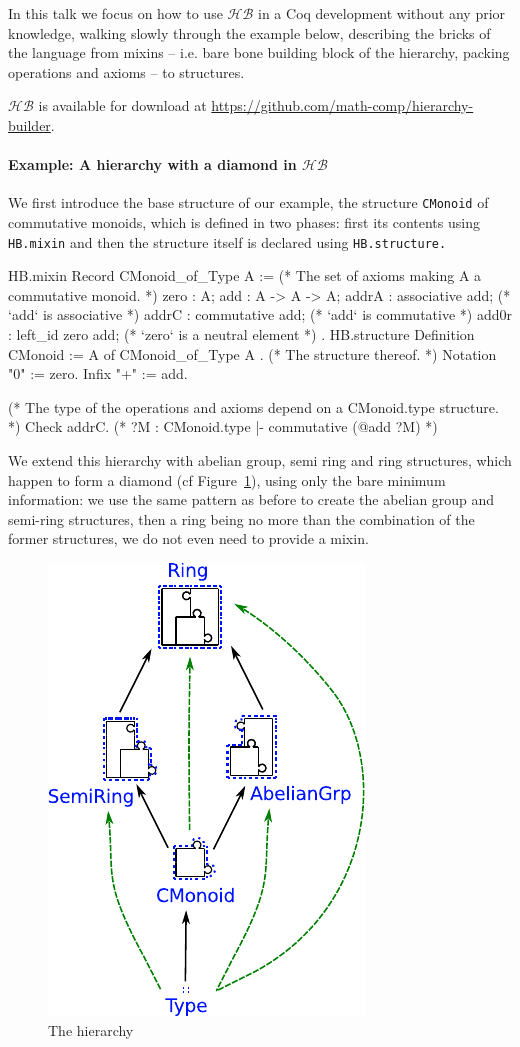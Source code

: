 \documentclass{easychair}
\newcommand{\HB}{\ensuremath{\mathcal{HB}}}
\begin{document}
In this talk we focus on how to use \HB{} in a Coq development without
any prior knowledge, walking slowly through the example below,
describing the bricks of the language from mixins -- i.e. bare bone building
block of the hierarchy, packing operations and axioms -- to structures.

\HB{} is available for download at \url{https://github.com/math-comp/hierarchy-builder}.

\paragraph{Example: A hierarchy with a diamond in \HB{}}

We first introduce the base structure of our example, the structure
\verb-CMonoid- of commutative monoids, which is defined in two phases:
first its contents using \verb-HB.mixin- and then the structure itself
is declared using \verb-HB.structure.-

\begin{coqcode}
HB.mixin Record CMonoid_of_Type A := { (* The set of axioms making A a commutative monoid. *)
  zero  : A; add   : A -> A -> A;
  addrA : associative add;  (* `add` is associative  *)
  addrC : commutative add;  (* `add` is commutative  *)
  add0r : left_id zero add; (* `zero` is a neutral element *)
}.
HB.structure Definition CMonoid := { A of CMonoid_of_Type A }. (* The structure thereof. *)
Notation "0" := zero.
Infix    "+" := add.

(* The type of the operations and axioms depend on a CMonoid.type structure. *)
Check addrC. (* ?M : CMonoid.type |- commutative (@add ?M) *)
\end{coqcode}

We extend this hierarchy with abelian group, semi ring and ring
structures, which happen to form a diamond (cf
Figure~\ref{fig:hierarchy}), using only the bare minimum information:
we use the same pattern as before to create the abelian group and
semi-ring structures, then a ring being no more than the combination
of the former structures, we do not even need to provide a mixin.

\begin{figure}
  \vspace{-27em}
  \includegraphics[width=.35\textwidth]{diagram.pdf}
  \vspace{-1.5em}
  \caption{The hierarchy}
  \label{fig:hierarchy}
\end{figure}
\end{document}
